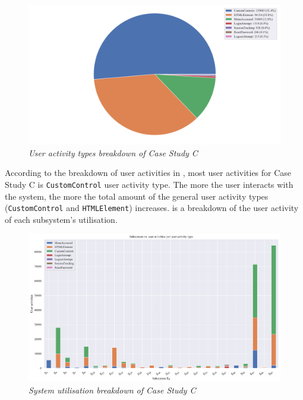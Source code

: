 \begin{figure}[!htb]
	\centering %
	\includegraphics[width=0.95\linewidth]{img/ch3/analysis/case_C_breakdown.pdf}
	\caption[User activity types breakdown of Case Study C]
	{\textit{User activity types breakdown of Case Study C}}\label{fig:ch3_caseCBreakdown}
\end{figure}

According to the breakdown of user activities in , most user activities for Case Study C is \texttt{CustomControl} user activity type. The more the user interacts with the system, the more the total amount of the general user activity types (\texttt{CustomControl} and \texttt{HTMLElement}) increases.  is a breakdown of the user activity of each subsystem's utilisation.

\clearpage

\begin{figure}[!htb]
	\centering %
	\includegraphics[width=0.95\linewidth]{img/ch3/analysis/case_C_subsystems_1.pdf}
	\caption[System utilisation breakdown of Case Study C]
	{\textit{System utilisation breakdown of Case Study C}}\label{fig:ch3_caseCAnalysis}
\end{figure} 

